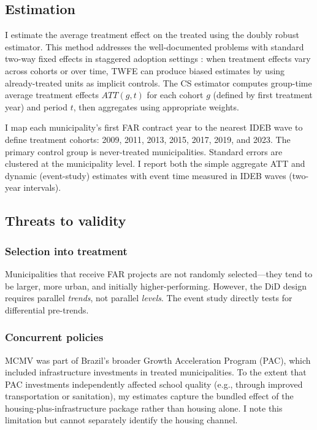 \documentclass[12pt]{article}
\begin{document}
\subsection{Estimation}

I estimate the average treatment effect on the treated using the \citet{callaway2021difference} doubly robust estimator. This method addresses the well-documented problems with standard two-way fixed effects in staggered adoption settings \citep{goodman2021difference, sun2021estimating, dechaisemartin2020two}: when treatment effects vary across cohorts or over time, TWFE can produce biased estimates by using already-treated units as implicit controls. The CS estimator computes group-time average treatment effects $ATT(g,t)$ for each cohort $g$ (defined by first treatment year) and period $t$, then aggregates using appropriate weights.

I map each municipality's first FAR contract year to the nearest IDEB wave to define treatment cohorts: 2009, 2011, 2013, 2015, 2017, 2019, and 2023. The primary control group is never-treated municipalities. Standard errors are clustered at the municipality level. I report both the simple aggregate ATT and dynamic (event-study) estimates with event time measured in IDEB waves (two-year intervals).

\subsection{Threats to validity}

\subsubsection*{Selection into treatment} Municipalities that receive FAR projects are not randomly selected---they tend to be larger, more urban, and initially higher-performing. However, the DiD design requires parallel \textit{trends}, not parallel \textit{levels}. The event study directly tests for differential pre-trends.

\subsubsection*{Concurrent policies} MCMV was part of Brazil's broader Growth Acceleration Program (PAC), which included infrastructure investments in treated municipalities. To the extent that PAC investments independently affected school quality (e.g., through improved transportation or sanitation), my estimates capture the bundled effect of the housing-plus-infrastructure package rather than housing alone. I note this limitation but cannot separately identify the housing channel.
\end{document}
